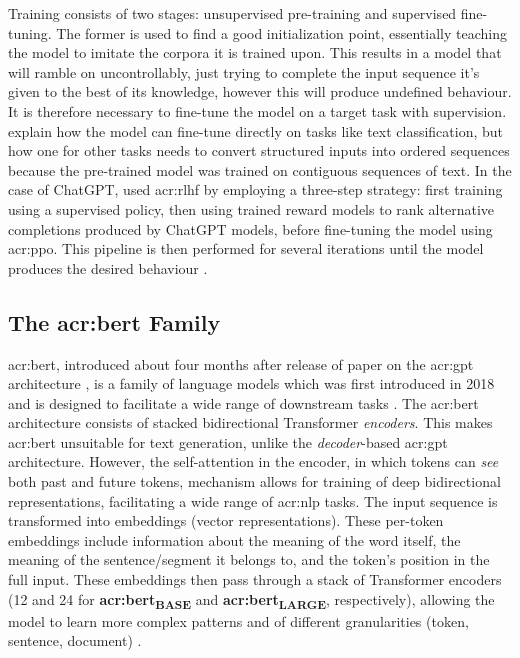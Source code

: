 Training consists of two stages: unsupervised pre-training and supervised fine-tuning. The former is used to find a good initialization point, essentially teaching the model to imitate the corpora it is trained upon. This results in a model that will ramble on uncontrollably, just trying to complete the input sequence it's given to the best of its knowledge, however this will produce undefined behaviour. It is therefore necessary to fine-tune the model on a target task with supervision. \cite[4]{radfordImprovingLanguageUnderstanding2018} explain how the model can fine-tune directly on tasks like text classification, but how one for other tasks needs to convert structured inputs into ordered sequences because the pre-trained model was trained on contiguous sequences of text. In the case of ChatGPT, \citeauthor{openaiIntroducingChatGPT2022} used \gls{acr:rlhf} by employing a three-step strategy: first training using a supervised policy, then using trained reward models to rank alternative completions produced by ChatGPT models, before fine-tuning the model using \gls{acr:ppo}. This pipeline is then performed for several iterations until the model produces the desired behaviour \citep{openaiIntroducingChatGPT2022}.

\subsection[The BERT Family]{The \acrshort{acr:bert} Family}\label{subsec:bert}

\gls{acr:bert}, introduced about four months after release of paper on the \acrshort{acr:gpt} architecture \citep{radfordImprovingLanguageUnderstanding2018}, is a family of language models which was first introduced in 2018 and is designed to facilitate a wide range of downstream tasks \citep[5]{devlinBERTPretrainingDeep2019}. The \acrshort{acr:bert} architecture consists of stacked bidirectional Transformer \textit{encoders}. This makes \acrshort{acr:bert} unsuitable for text generation, unlike the \textit{decoder}-based \acrshort{acr:gpt} architecture. However, the self-attention in the encoder, in which tokens can \textit{see} both past and future tokens, mechanism allows for training of deep bidirectional representations, facilitating a wide range of \gls{acr:nlp} tasks. The input sequence is transformed into embeddings (vector representations). These per-token embeddings include information about the meaning of the word itself, the meaning of the sentence/segment it belongs to, and the token's position in the full input. These embeddings then pass through a stack of Transformer encoders (12 and 24 for \textbf{\acrshort{acr:bert}\textsubscript{BASE}} and \textbf{\acrshort{acr:bert}\textsubscript{LARGE}}, respectively), allowing the model to learn more complex patterns and of different granularities (token, sentence, document) \citep[5]{devlinBERTPretrainingDeep2019}.

